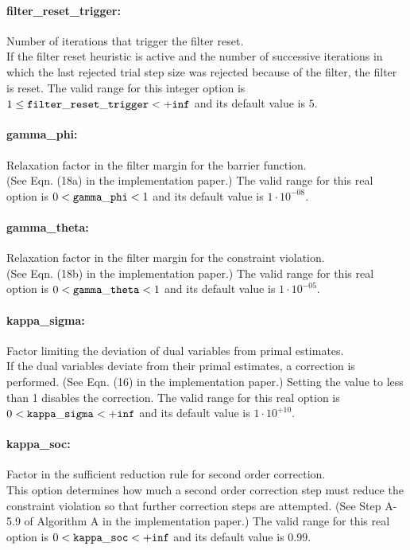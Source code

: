\paragraph{filter\_reset\_trigger:}\label{sec:filter_reset_trigger} Number of iterations that trigger the filter reset. $\;$ \\
 If the filter reset heuristic is active and the
number of successive iterations in which the last
rejected trial step size was rejected because of
the filter, the filter is reset. The valid range for this integer option is
$1 \le {\tt filter\_reset\_trigger } <  {\tt +inf}$
and its default value is $5$.


\paragraph{gamma\_phi:}\label{sec:gamma_phi} Relaxation factor in the filter margin for the barrier function. $\;$ \\
 (See Eqn. (18a) in the implementation paper.) The valid range for this real option is 
$0 <  {\tt gamma\_phi } <  1$
and its default value is $1 \cdot 10^{-08}$.


\paragraph{gamma\_theta:}\label{sec:gamma_theta} Relaxation factor in the filter margin for the constraint violation. $\;$ \\
 (See Eqn. (18b) in the implementation paper.) The valid range for this real option is 
$0 <  {\tt gamma\_theta } <  1$
and its default value is $1 \cdot 10^{-05}$.


\paragraph{kappa\_sigma:}\label{sec:kappa_sigma} Factor limiting the deviation of dual variables from primal estimates. $\;$ \\
 If the dual variables deviate from their primal
estimates, a correction is performed. (See Eqn.
(16) in the implementation paper.) Setting the
value to less than 1 disables the correction. The valid range for this real option is 
$0 <  {\tt kappa\_sigma } <  {\tt +inf}$
and its default value is $1 \cdot 10^{+10}$.


\paragraph{kappa\_soc:}\label{sec:kappa_soc} Factor in the sufficient reduction rule for second order correction. $\;$ \\
 This option determines how much a second order
correction step must reduce the constraint
violation so that further correction steps are
attempted.  (See Step A-5.9 of Algorithm A in the
implementation paper.) The valid range for this real option is 
$0 <  {\tt kappa\_soc } <  {\tt +inf}$
and its default value is $0.99$.


